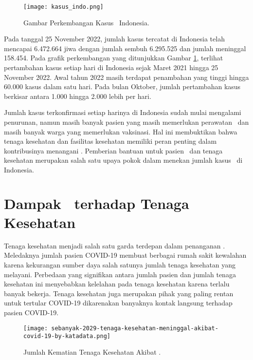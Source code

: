\begin{figure}[H]
        \centering
        \texttt{[image: kasus\_indo.png]}
        \caption{Gambar Perkembangan Kasus \covid\ Indonesia\cite{a1}.}
        \label{fig:Ch01_Indonesia}
    \end{figure}

Pada tanggal 25 November 2022, jumlah kasus tercatat di Indonesia telah mencapai 6.472.664 jiwa dengan jumlah sembuh 6.295.525 dan jumlah meninggal 158.454\cite{a3}. Pada grafik perkembangan yang ditunjukkan Gambar \ref{fig:Ch01_Indonesia}, terlihat pertambahan kasus setiap hari di Indonesia sejak Maret 2021 hingga 25 November 2022. Awal tahun 2022 masih terdapat penambahan yang tinggi hingga 60.000 kasus dalam satu hari. Pada bulan Oktober, jumlah pertambahan kasus berkisar antara 1.000 hingga 2.000 lebih per hari. 

Jumlah kasus terkonfirmasi setiap harinya di Indonesia sudah mulai mengalami penurunan, namun masih banyak pasien yang masih memerlukan perawatan \covid\ dan masih banyak warga yang memerlukan vaksinasi. Hal ini membuktikan bahwa tenaga kesehatan dan fasilitas kesehatan memiliki peran penting dalam kontribusinya menangani \covid. Pemberian bantuan untuk pasien \covid\ dan tenaga kesehatan merupakan salah satu upaya pokok dalam menekan jumlah kasus \covid\ di Indonesia.

\section{Dampak \covid\ terhadap Tenaga Kesehatan}
\label{sec:Dampak_Covid_RS}
Tenaga kesehatan menjadi salah satu garda terdepan dalam penanganan \covid. Meledaknya jumlah pasien COVID-19 membuat berbagai rumah sakit kewalahan karena kekurangan sumber daya salah satunya jumlah tenaga kesehatan yang melayani. Perbedaan yang signifikan antara jumlah pasien dan jumlah tenaga kesehatan ini menyebabkan kelelahan pada tenaga kesehatan karena terlalu banyak bekerja. Tenaga kesehatan juga merupakan pihak yang paling rentan untuk tertular COVID-19 dikarenakan banyaknya kontak langsung terhadap pasien COVID-19. 

\begin{figure}[H]
    \centering
    \texttt{[image: sebanyak-2029-tenaga-kesehatan-meninggal-akibat-covid-19-by-katadata.png]}
    \caption{Jumlah Kematian Tenaga Kesehatan Akibat \covid\cite{a6}.}
    \label{fig:Ch01_sebaran_nakes}
\end{figure}

